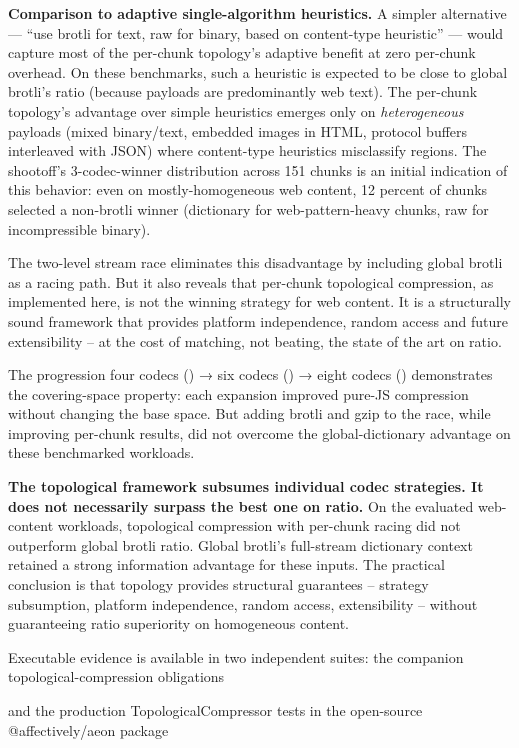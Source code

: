\documentclass[
]{article}
\begin{document}
\textbf{Comparison to adaptive single-algorithm heuristics.} A simpler
alternative --- ``use brotli for text, raw for binary, based on
content-type heuristic'' --- would capture most of the per-chunk
topology's adaptive benefit at zero per-chunk overhead. On these
benchmarks, such a heuristic is expected to be close to global brotli's
ratio (because payloads are predominantly web text). The per-chunk
topology's advantage over simple heuristics emerges only on
\emph{heterogeneous} payloads (mixed binary/text, embedded images in
HTML, protocol buffers interleaved with JSON) where content-type
heuristics misclassify regions. The shootoff's 3-codec-winner
distribution across 151 chunks is an initial indication of this
behavior: even on mostly-homogeneous web content, 12 percent of chunks
selected a non-brotli winner (dictionary for web-pattern-heavy chunks,
raw for incompressible binary).

The two-level stream race eliminates this disadvantage by including
global brotli as a racing path. But it also reveals that per-chunk
topological compression, as implemented here, is not the winning
strategy for web content. It is a structurally sound framework that
provides platform independence, random access and future extensibility
-- at the cost of matching, not beating, the state of the art on ratio.

The progression four codecs () → six codecs () → eight codecs ()
demonstrates the covering-space property: each expansion improved
pure-JS compression without changing the base space. But adding brotli
and gzip to the race, while improving per-chunk results, did not
overcome the global-dictionary advantage on these benchmarked workloads.

\textbf{The topological framework subsumes individual codec strategies.
It does not necessarily surpass the best one on ratio.} On the evaluated
web-content workloads, topological compression with per-chunk racing did
not outperform global brotli ratio. Global brotli's full-stream
dictionary context retained a strong information advantage for these
inputs. The practical conclusion is that topology provides structural
guarantees -- strategy subsumption, platform independence, random
access, extensibility -- without guaranteeing ratio superiority on
homogeneous content.

Executable evidence is available in two independent suites: the
companion topological-compression obligations

and the production TopologicalCompressor tests in the open-source
@affectively/aeon package
\end{document}
